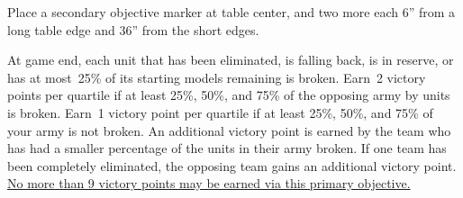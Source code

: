 
\teaser{}

\begin{tablesetup}
  \vanguardstrike

  \bigskip%
  Place a secondary objective marker at table center, and two more
  each 6'' from a long table edge and 36'' from the short edges.
\end{tablesetup}


\begin{missionrules}

\nightfighting

\end{missionrules}


\begin{scoring}
  
\begin{primaries}
  At game end, each unit that has been eliminated, is falling back, is
  in reserve, or has at most~25\% of its starting models remaining is
  broken.  Earn~2 victory points per quartile if at least 25\%, 50\%,
  and 75\% of the opposing army by units is broken.  Earn~1 victory
  point per quartile if at least 25\%, 50\%, and 75\% of your army is
  not broken.  An additional victory point is earned by the team who
  has had a smaller percentage of the units in their army broken.  If
  one team has been completely eliminated, the opposing team gains an
  additional victory point.  \underline{No more than 9 victory points
    may be earned via this primary objective.}
\end{primaries}

\begin{secondaries}
  \holdthefield

  \controlthefield

  \breachpoints
\end{secondaries}

\end{scoring}
